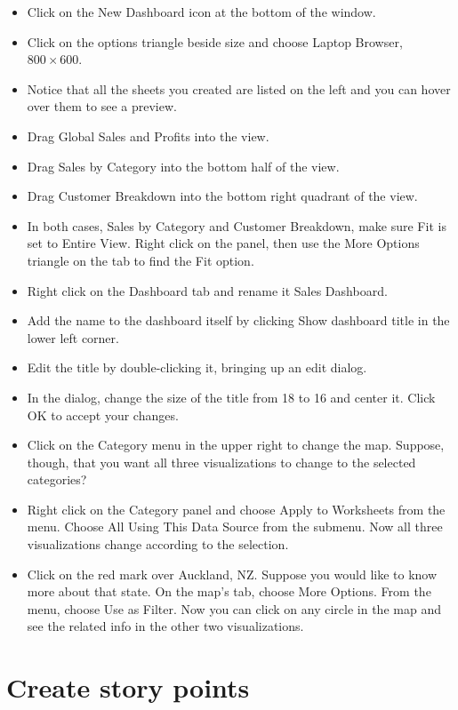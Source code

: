 \begin{itemize}
\tightlist
\item
  Click on the New Dashboard icon at the bottom of the window.
\item
  Click on the options triangle beside size and choose Laptop Browser,
  \(800 \times 600\).
\item
  Notice that all the sheets you created are listed on the left and you
  can hover over them to see a preview.
\item
  Drag Global Sales and Profits into the view.
\item
  Drag Sales by Category into the bottom half of the view.
\item
  Drag Customer Breakdown into the bottom right quadrant of the view.
\item
  In both cases, Sales by Category and Customer Breakdown, make sure Fit
  is set to Entire View. Right click on the panel, then use the More
  Options triangle on the tab to find the Fit option.
\item
  Right click on the Dashboard tab and rename it Sales Dashboard.
\item
  Add the name to the dashboard itself by clicking Show dashboard title
  in the lower left corner.
\item
  Edit the title by double-clicking it, bringing up an edit dialog.
\item
  In the dialog, change the size of the title from 18 to 16 and center
  it. Click OK to accept your changes.
\item
  Click on the Category menu in the upper right to change the map.
  Suppose, though, that you want all three visualizations to change to
  the selected categories?
\item
  Right click on the Category panel and choose Apply to Worksheets from
  the menu. Choose All Using This Data Source from the submenu. Now all
  three visualizations change according to the selection.
\item
  Click on the red mark over Auckland, NZ. Suppose you would like to
  know more about that state. On the map's tab, choose More Options.
  From the menu, choose Use as Filter. Now you can click on any circle
  in the map and see the related info in the other two visualizations.
\end{itemize}

\section{Create story points}\label{create-story-points}

